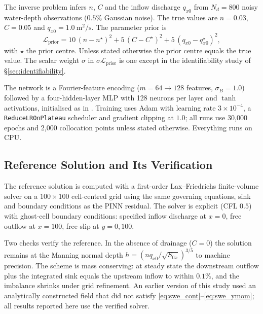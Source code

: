 \documentclass[a4paper,fleqn]{cas-sc}
\begin{document}
The inverse problem infers $n$, $C$ and the inflow discharge $q_{x0}$ from
$N_d = 800$ noisy water-depth observations ($0.5\%$ Gaussian noise). The true
values are $n = 0.03$, $C = 0.05$ and $q_{x0} = 1.0\ \mathrm{m^2/s}$. The
parameter prior is
\begin{equation}
\mathcal{L}_{\text{prior}} = 10\,(n - n^\star)^2 + 5\,(C - C^\star)^2
+ 5\,(q_{x0} - q_{x0}^\star)^2 ,
\label{eq:prior}
\end{equation}
with $\star$ the prior centre. Unless stated otherwise the prior centre equals
the true value. The scalar weight $\sigma$ in
$\sigma \mathcal{L}_{\text{prior}}$ is one except in the identifiability study
of \S\ref{sec:identifiability}.

The network is a Fourier-feature encoding
\citep{tancik2020fourier,rahaman2019spectral} ($m = 64 \to 128$ features,
$\sigma_B = 1.0$) followed by a four-hidden-layer MLP with 128 neurons per
layer and $\tanh$ activations, initialised as in \citep{glorot2010understanding}.
Training uses Adam \citep{kingma2014adam} with learning rate
$3\times10^{-4}$, a \texttt{ReduceLROnPlateau} scheduler and gradient clipping
at $1.0$; all runs use 30{,}000 epochs and 2{,}000 collocation points unless
stated otherwise. Everything runs on CPU.

\subsection{Reference Solution and Its Verification}
\label{sec:reference}

The reference solution is computed with a first-order Lax--Friedrichs
finite-volume solver on a $100\times100$ cell-centred grid using the same
governing equations, sink and boundary conditions as the PINN residual. The
solver is explicit (CFL $0.5$) with ghost-cell boundary conditions: specified
inflow discharge at $x=0$, free outflow at $x=100$, free-slip at $y=0,100$.

Two checks verify the reference. In the absence of drainage ($C=0$) the
solution remains at the Manning normal depth $h = (n q_{x0}/\sqrt{S_{0x}})^{3/5}$
to machine precision. The scheme is mass conserving: at steady state the
downstream outflow plus the integrated sink equals the upstream inflow to
within $0.1\%$, and the imbalance shrinks under grid refinement. An earlier
version of this study used an analytically constructed field that did not
satisfy \eqref{eq:swe_cont}--\eqref{eq:swe_ymom}; all results reported here use
the verified solver.
\end{document}
